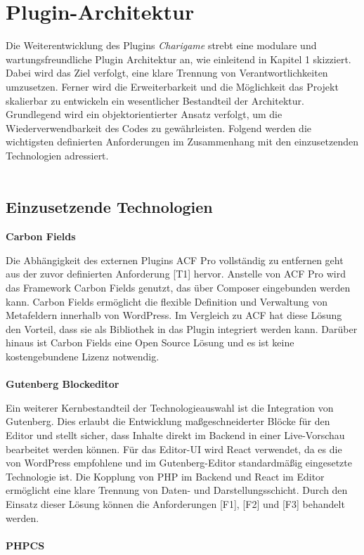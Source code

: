 \section{Plugin-Architektur}
Die Weiterentwicklung des Plugins \emph{Charigame} strebt eine modulare und wartungsfreundliche Plugin Architektur an, wie einleitend in Kapitel 1 skizziert. %
Dabei wird das Ziel verfolgt, eine klare Trennung von Verantwortlichkeiten umzusetzen.
Ferner wird die Erweiterbarkeit und die Möglichkeit das Projekt skalierbar zu entwickeln ein wesentlicher Bestandteil der Architektur.
Grundlegend wird ein objektorientierter Ansatz verfolgt, um die Wiederverwendbarkeit des Codes zu gewährleisten.
Folgend werden die wichtigsten definierten Anforderungen im Zusammenhang mit den einzusetzenden Technologien adressiert.
\\\\
\subsection{Einzusetzende Technologien}
\textbf{Carbon Fields}

Die Abhängigkeit des externen Plugins ACF Pro vollständig zu entfernen geht aus der zuvor definierten Anforderung [T1] hervor.
Anstelle von ACF Pro wird das Framework Carbon Fields genutzt, das über Composer eingebunden werden kann.
Carbon Fields ermöglicht die flexible Definition und Verwaltung von Metafeldern innerhalb von WordPress.
Im Vergleich zu ACF hat diese Lösung den Vorteil, dass sie als Bibliothek in das Plugin integriert werden kann.
Darüber hinaus ist Carbon Fields eine Open Source Lösung und es ist keine kostengebundene Lizenz notwendig.
\\\\
\textbf{Gutenberg Blockeditor}

Ein weiterer Kernbestandteil der Technologieauswahl ist die Integration von Gutenberg.
Dies erlaubt die Entwicklung maßgeschneiderter Blöcke für den Editor und stellt sicher, dass Inhalte direkt im Backend in einer Live-Vorschau bearbeitet werden können.
Für das Editor-UI wird React verwendet, da es die von WordPress empfohlene und im Gutenberg-Editor standardmäßig eingesetzte Technologie ist.
Die Kopplung von PHP im Backend und React im Editor ermöglicht eine klare Trennung von Daten- und Darstellungsschicht.
Durch den Einsatz dieser Lösung können die Anforderungen [F1], [F2] und [F3] behandelt werden.
\\\\
\textbf{PHPCS}

